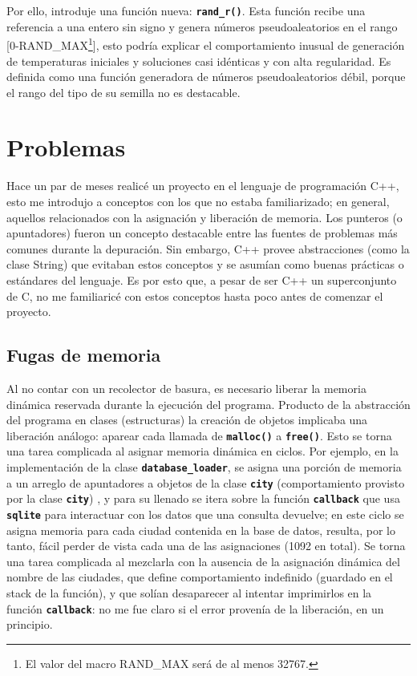 \documentclass[a4paper]{report}
\begin{document}
Por ello, introduje una funci\'on nueva: \textbf{\texttt{rand\_r()}}. Esta funci\'on recibe una referencia
a una entero sin signo y genera n\'umeros pseudoaleatorios en el rango [0-RAND\_MAX\footnote{El valor del
  macro RAND\_MAX ser\'a de al menos 32767.}], esto podr\'ia explicar el comportamiento inusual de generaci\'on
de temperaturas iniciales y soluciones casi id\'enticas y con alta regularidad. Es definida como una funci\'on
generadora de n\'umeros pseudoaleatorios d\'ebil, porque el rango del tipo de su semilla no es destacable.

\section{Problemas}
Hace un par de meses realic\'e un proyecto en el lenguaje de programaci\'on C++, esto me introdujo a
conceptos con los que no estaba familiarizado; en general, aquellos relacionados con la asignaci\'on
y liberaci\'on de memoria. Los punteros (o apuntadores) fueron un concepto destacable entre las fuentes de
problemas m\'as comunes durante la depuraci\'on. Sin embargo, C++ provee abstracciones (como la clase
String) que evitaban estos conceptos y se asum\'ian como buenas pr\'acticas o est\'andares del lenguaje.
Es por esto que, a pesar de ser C++ un superconjunto de C, no me familiaric\'e con estos conceptos hasta
poco antes de comenzar el proyecto.

\subsection{Fugas de memoria}
Al no contar con un recolector de basura, es necesario liberar la memoria din\'amica reservada durante
la ejecuci\'on del programa. Producto de la abstracci\'on del programa en clases (estructuras)
la creaci\'on de objetos implicaba una liberaci\'on an\'alogo: aparear cada llamada de \textbf{\texttt{malloc()}}
a \textbf{\texttt{free()}}. Esto se torna una tarea complicada al asignar memoria din\'amica en ciclos. Por ejemplo,
en la implementaci\'on de la clase \textbf{\texttt{database\_loader}}, se asigna una porci\'on de memoria a un
arreglo de apuntadores a objetos  de la clase \textbf{\texttt{city}} (comportamiento provisto por la clase
\textbf{\texttt{city}}) , y para su llenado se itera sobre la funci\'on \textbf{\texttt{callback}} que usa
\textbf{\texttt{sqlite}} para interactuar con los datos que una consulta devuelve; en este ciclo se asigna
memoria para cada ciudad contenida en la base de datos, resulta, por lo tanto, f\'acil perder de vista
cada una de las asignaciones (1092 en total). Se torna una tarea complicada al mezclarla con la ausencia
de la asignaci\'on din\'amica del nombre de las ciudades, que define comportamiento indefinido (guardado en
el stack de la funci\'on), y que sol\'ian desaparecer al intentar imprimirlos en la funci\'on \textbf{\texttt{callback}}:
no me fue claro si el error proven\'ia de la liberaci\'on, en un principio.\\
\end{document}
